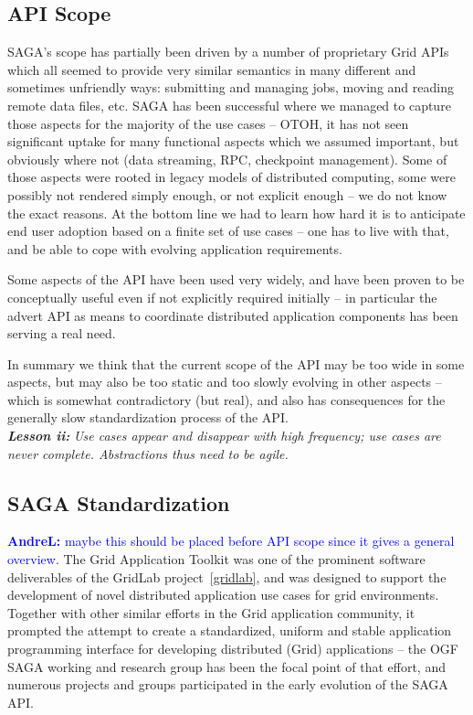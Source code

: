 \documentclass[]{article}
\newcommand{\I}[1]{\textit{#1}}
\newcommand{\B}[1]{\textbf{#1}}
\newcommand{\BI}[1]{\textbf{\textit{#1}}}
\newcommand{\alnote}[1]{{\textcolor{blue}{    \B{AndreL:  } #1 }}}
\newcommand{\alnote}[1]{}
\begin{document}
 \subsection{API Scope}

  SAGA's scope has partially been driven by a number of proprietary
  Grid APIs which all seemed to provide very similar semantics in many
  different and sometimes unfriendly ways: submitting and managing
  jobs, moving and reading remote data files, etc.  SAGA has been
  successful where we managed to capture those aspects for the
  majority of the use cases -- OTOH, it has not seen significant
  uptake for many functional aspects which we assumed important, but
  obviously where not (data streaming, RPC, checkpoint management).
  Some of those aspects were rooted in legacy models of distributed
  computing, some were possibly not rendered simply enough, or not
  explicit enough -- we do not know the exact reasons.  At the bottom
  line we had to learn how hard it is to anticipate end user adoption
  based on a finite set of use cases -- one has to live with that, and
  be able to cope with evolving application requirements.

  Some aspects of the API have been used very widely, and have been
  proven to be conceptually useful even if not explicitly required
  initially -- in particular the advert API as means to coordinate
  distributed application components has been serving a real need.

  In summary we think that the current scope of the API may be too
  wide in some aspects, but may also be too static and too slowly
  evolving in other aspects -- which is somewhat contradictory (but
  real), and also has consequences for the generally slow
  standardization process of the API.\\
  \BI{Lesson ii:} \I{Use cases appear and disappear with high frequency;
  use cases are never complete.  Abstractions thus need to be agile.}


 \subsection{SAGA Standardization}
  \alnote{maybe this should be placed before API scope since it gives a 
  general overview.}
  The Grid Application Toolkit was one of the prominent software
  deliverables of the GridLab project~\ref{gridlab}, and was designed
  to support the development of novel distributed application use
  cases for grid environments.  Together with other similar efforts in
  the Grid application community, it prompted the attempt to create
  a standardized, uniform and stable application programming interface
  for developing distributed (Grid) applications -- the OGF SAGA
  working and research group has been the focal point of that effort,
  and numerous projects and groups participated in the early
  evolution of the SAGA API.  
\end{document}
